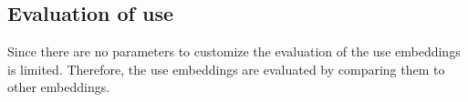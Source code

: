 \subsection*{Evaluation of \ac{use}}\label{subsec:evaluation-use}

Since there are no parameters to customize the evaluation of the \ac{use} embeddings is limited.
Therefore, the \ac{use} embeddings are evaluated by comparing them to other embeddings.